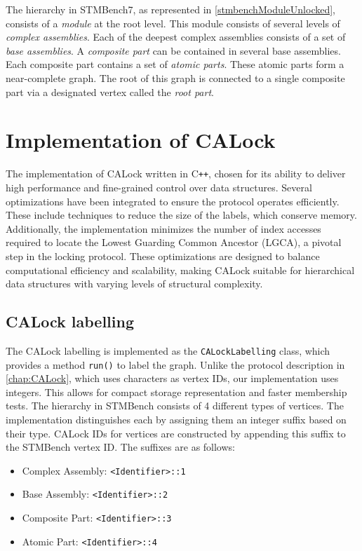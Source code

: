 The hierarchy in STMBench7, as represented in \cref{stmbenchModuleUnlocked}, consists of a \emph{module} at the root level. This module consists of several levels of \emph{complex assemblies}. 
Each of the deepest complex assemblies consists of a set of \emph{base assemblies}. 
A \emph{composite part} can be contained in several base assemblies. 
Each composite part contains a set of \emph{atomic parts}. 
These atomic parts form a near-complete graph. 
The root of this graph is connected to a single composite part via a designated vertex called the \emph{root part}.
	



\section{Implementation of CALock}
The implementation of CALock written in C\texttt{++}, chosen for its ability to deliver high performance and fine-grained control over data structures. 
Several optimizations have been integrated to ensure the protocol operates efficiently. These include techniques to reduce the size of the labels, which conserve memory. Additionally, the implementation minimizes the number of index accesses required to locate the Lowest Guarding Common Ancestor (LGCA), a pivotal step in the locking protocol. These optimizations are designed to balance computational efficiency and scalability, making CALock suitable for hierarchical data structures with varying levels of structural complexity.

\subsection{CALock labelling}
\label{sec:calock-labelling}
The CALock labelling is implemented as the \texttt{CALockLabelling} class, which provides a method \texttt{run()} to label the graph. Unlike the protocol description in \cref{chap:CALock}, which uses characters as vertex IDs, our implementation uses integers. This allows for compact storage representation and faster membership tests. The hierarchy in STMBench consists of 4 different types of vertices. The implementation distinguishes each by assigning them an integer suffix based on their type. CALock IDs for vertices are constructed by appending this suffix to the STMBench vertex ID. The suffixes are as follows:

\begin{itemize}
    \item Complex Assembly: \texttt{<Identifier>::1}
    \item Base Assembly: \texttt{<Identifier>::2}
    \item Composite Part: \texttt{<Identifier>::3}
    \item Atomic Part: \texttt{<Identifier>::4}
\end{itemize}

